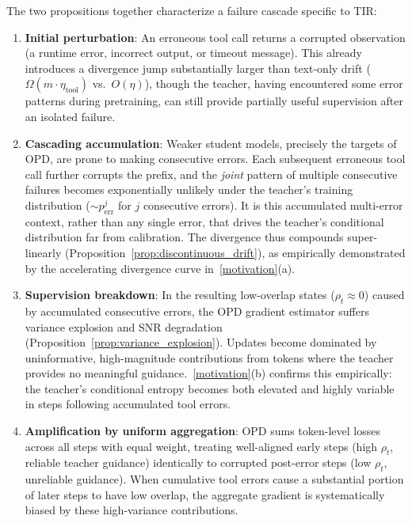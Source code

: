 The two propositions together characterize a failure cascade specific to TIR:
\begin{enumerate}
    \item \textbf{Initial perturbation}: An erroneous tool call returns a corrupted observation (\eg a runtime error, incorrect output, or timeout message). This already introduces a divergence jump substantially larger than text-only drift ($\Omega(m \cdot \eta_{\mathrm{tool}})$ vs.\ $O(\eta)$), though the teacher, having encountered some error patterns during pretraining, can still provide partially useful supervision after an isolated failure.
    
    \item \textbf{Cascading accumulation}: Weaker student models, precisely the targets of OPD, are prone to making consecutive errors. Each subsequent erroneous tool call further corrupts the prefix, and the \emph{joint} pattern of multiple consecutive failures becomes exponentially unlikely under the teacher's training distribution ($\sim p_{\mathrm{err}}^j$ for $j$ consecutive errors). It is this accumulated multi-error context, rather than any single error, that drives the teacher's conditional distribution far from calibration. The divergence thus compounds super-linearly (Proposition~\ref{prop:discontinuous_drift}), as empirically demonstrated by the accelerating divergence curve in~\cref{motivation}(a).
    
    \item \textbf{Supervision breakdown}: In the resulting low-overlap states ($\rho_t \approx 0$) caused by accumulated consecutive errors, the OPD gradient estimator suffers variance explosion and SNR degradation (Proposition~\ref{prop:variance_explosion}). Updates become dominated by uninformative, high-magnitude contributions from tokens where the teacher provides no meaningful guidance.~\cref{motivation}(b) confirms this empirically: the teacher's conditional entropy becomes both elevated and highly variable in steps following accumulated tool errors.
    
    \item \textbf{Amplification by uniform aggregation}: OPD sums token-level losses across all steps with equal weight, treating well-aligned early steps (high $\rho_t$, reliable teacher guidance) identically to corrupted post-error steps (low $\rho_t$, unreliable guidance). When cumulative tool errors cause a substantial portion of later steps to have low overlap, the aggregate gradient is systematically biased by these high-variance contributions.
\end{enumerate}

